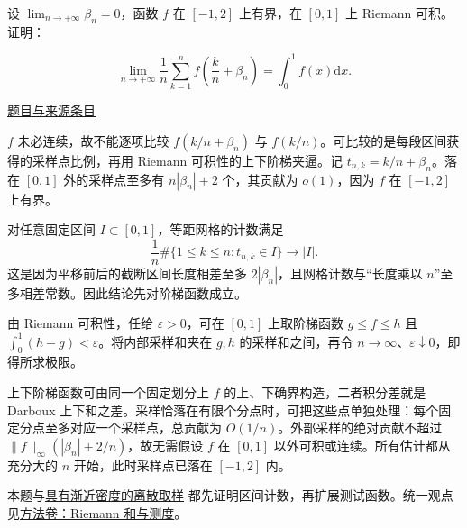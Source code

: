 \documentclass[UTF8,12pt,a4paper,fontset=fandol]{ctexart}
\begin{document}
\begin{example}[来源序号5]\label{ex:ch04-14th-A:5}\label{pr:ch04-14th-A:5}

设 $\lim_{n\rightarrow+\infty}\beta_{n}=0$，函数 $f$ 在 $[-1,2]$ 上有界，在 $[0,1]$ 上 Riemann 可积。证明：

\[
\lim_{n\rightarrow+\infty}\frac{1}{n}\sum_{k=1}^{n}f\left(\frac{k}{n}+\beta_{n}\right)=\int_{0}^{1}f(x)\mathrm{d}x.
\]

\par\href{https://github.com/lzxcr/cmc-mathematics/blob/64916fa1fdbc3e444a652eca204d5669058ee321/src/problems/preliminary/14/05.md}{题目与来源条目}

\end{example}

\begin{solve}\label{ans:ch04-14th-A:5}

$f$ 未必连续，故不能逐项比较 $f(k/n+\beta_n)$ 与 $f(k/n)$。可比较的是每段区间获得的采样点比例，再用 Riemann 可积性的上下阶梯夹逼。记 $t_{n,k}=k/n+\beta_n$。落在 $[0,1]$ 外的采样点至多有 $n|\beta_n|+2$ 个，其贡献为 $o(1)$，因为 $f$ 在 $[-1,2]$ 上有界。

对任意固定区间 $I\subset[0,1]$，等距网格的计数满足
\[
\frac1n\#\{1\leq k\leq n:t_{n,k}\in I\}\longrightarrow |I|.
\]
这是因为平移前后的截断区间长度相差至多 $2|\beta_n|$，且网格计数与“长度乘以 $n$”至多相差常数。因此结论先对阶梯函数成立。

由 Riemann 可积性，任给 $\varepsilon>0$，可在 $[0,1]$ 上取阶梯函数 $g\leq f\leq h$ 且 $\int_0^1(h-g)<\varepsilon$。将内部采样和夹在 $g,h$ 的采样和之间，再令 $n\to\infty$、$\varepsilon\downarrow0$，即得所求极限。

上下阶梯函数可由同一个固定划分上 $f$ 的上、下确界构造，二者积分差就是 Darboux 上下和之差。采样恰落在有限个分点时，可把这些点单独处理：每个固定分点至多对应一个采样点，总贡献为 $O(1/n)$。外部采样的绝对贡献不超过 $\|f\|_\infty(|\beta_n|+2/n)$，故无需假设 $f$ 在 $[0,1]$ 以外可积或连续。所有估计都从充分大的 $n$ 开始，此时采样点已落在 $[-1,2]$ 内。

\end{solve}

\begin{remark}[方法与条件]本题与\hyperref[pr:ch01-17th-A:6]{具有渐近密度的离散取样} 都先证明区间计数，再扩展测试函数。统一观点见\hyperref[app:integration-riemann]{方法卷：Riemann 和与测度}。\end{remark}
\end{document}
